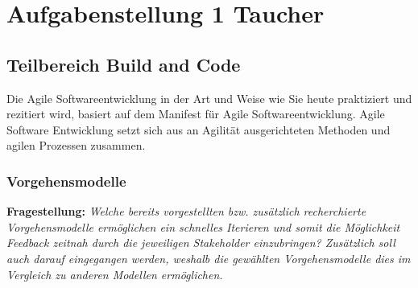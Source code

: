 \newpage
\section{Aufgabenstellung 1 Taucher}

                      


\subsection{Teilbereich Build and Code}
Die Agile Softwareentwicklung in der Art und Weise wie Sie heute praktiziert und rezitiert wird, basiert auf dem Manifest für Agile Softwareentwicklung. 
Agile Software Entwicklung setzt sich aus an Agilität ausgerichteten Methoden und agilen Prozessen zusammen. 

\subsubsection{Vorgehensmodelle}
\textbf{Fragestellung:} \textit{Welche bereits vorgestellten bzw. zusätzlich recherchierte Vorgehensmodelle ermöglichen ein
schnelles Iterieren und somit die Möglichkeit Feedback zeitnah durch die jeweiligen Stakeholder
einzubringen? Zusätzlich soll auch darauf eingegangen werden, weshalb die gewählten
Vorgehensmodelle dies im Vergleich zu anderen Modellen ermöglichen.}
\\

